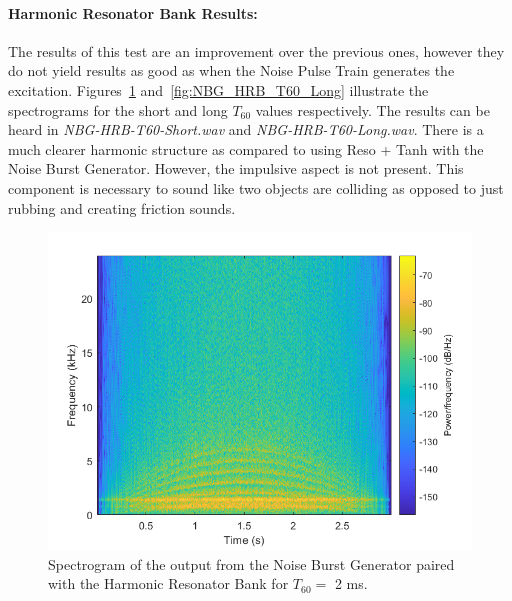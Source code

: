 \documentclass[../main.tex]{subfiles}
\begin{document}
\clearpage

\paragraph{Harmonic Resonator Bank Results:}
The results of this test are an improvement over the previous ones, however they do not yield results as good as when the Noise Pulse Train generates the excitation. Figures~\ref{fig:NBG_HRB_T60_Short} and~\ref{fig:NBG_HRB_T60_Long} illustrate the spectrograms for the short and long $T_{60}$ values respectively. The results can be heard in \emph{NBG-HRB-T60-Short.wav} and \emph{NBG-HRB-T60-Long.wav}. There is a much clearer harmonic structure as compared to using Reso + Tanh with the Noise Burst Generator. However, the impulsive aspect is not present. This component is necessary to sound like two objects are colliding as opposed to just rubbing and creating friction sounds.

\begin{figure}[h!]
    \centering
    \includegraphics[scale=.65]{./images/plots/NBG-HRB-T60-Short.png}
    \caption{Spectrogram of the output from the Noise Burst Generator paired with the Harmonic Resonator Bank for $T_{60} = $ 2 ms.}
    \label{fig:NBG_HRB_T60_Short}
\end{figure}
\end{document}
